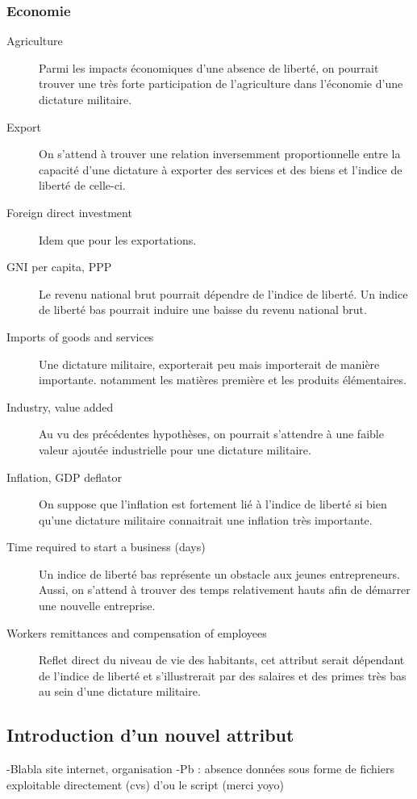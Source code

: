 \subsubsection{Economie}
\begin{description}
\item [Agriculture]
Parmi les impacts économiques d'une absence de liberté, on pourrait trouver une très forte participation de l'agriculture dans l'économie d'une dictature militaire.
\item [Export]
On s'attend à trouver une relation inversemment proportionnelle entre la capacité d'une dictature à exporter des services et des biens et l'indice de liberté de celle-ci.
\item [Foreign direct investment]
Idem que pour les exportations. 
\item [GNI per capita, PPP ]
Le revenu national brut pourrait dépendre de l'indice de liberté. Un indice de liberté bas pourrait induire une baisse du revenu national brut.
\item [Imports of goods and services] 
Une dictature militaire, exporterait peu mais importerait de manière importante. notamment les matières première et les produits élémentaires.
\item [Industry, value added]
Au vu des précédentes hypothèses, on pourrait s'attendre à une faible valeur ajoutée industrielle pour une dictature militaire. 
\item [Inflation, GDP deflator] 
On suppose que l'inflation est fortement lié à l'indice de liberté si bien qu'une dictature militaire connaitrait une inflation très importante.

\item [Time required to start a business (days)]
Un indice de liberté bas représente un obstacle aux jeunes entrepreneurs. Aussi, on s'attend à trouver des temps relativement hauts afin de démarrer une nouvelle entreprise. 
\item [Workers remittances and compensation of employees]
Reflet direct du niveau de vie des habitants, cet attribut serait dépendant de l'indice de liberté et s'illustrerait par des salaires et des primes très bas au sein d'une dictature militaire.

\end{description}

\subsection{Introduction d'un nouvel attribut}
-Blabla site internet, organisation
-Pb : absence données sous forme de fichiers exploitable directement (cvs) d'ou le script (merci yoyo)
